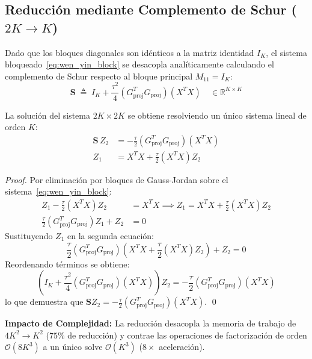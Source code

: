 \subsection{Reducción mediante Complemento de Schur ($2K \to K$)}
Dado que los bloques diagonales son idénticos a la matriz identidad $I_K$, el sistema bloqueado~\eqref{eq:wen_yin_block} se desacopla analíticamente calculando el complemento de Schur respecto al bloque principal $M_{11} = I_K$:
\begin{equation}
\mathbf{S} \;\triangleq\; I_K + \frac{\tau^2}{4} (G_{\text{proj}}^T G_{\text{proj}})(X^T X) \quad \in \mathbb{R}^{K \times K}
\end{equation}

\begin{theorem}

La solución del sistema $2K \times 2K$ se obtiene resolviendo un único sistema lineal de orden $K$:
\begin{align}
\mathbf{S} \, Z_2 &= -\frac{\tau}{2} (G_{\text{proj}}^T G_{\text{proj}})(X^T X) \\
Z_1 &= X^T X + \frac{\tau}{2} (X^T X) Z_2
\end{align}
\end{theorem}

\begin{proof}
Por eliminación por bloques de Gauss-Jordan sobre el sistema~\eqref{eq:wen_yin_block}:
\begin{align}
Z_1 - \frac{\tau}{2} (X^T X) Z_2 &= X^T X \implies Z_1 = X^T X + \frac{\tau}{2} (X^T X) Z_2 \\
\frac{\tau}{2} (G_{\text{proj}}^T G_{\text{proj}}) Z_1 + Z_2 &= 0
\end{align}
Sustituyendo $Z_1$ en la segunda ecuación:
\begin{equation}
\frac{\tau}{2} (G_{\text{proj}}^T G_{\text{proj}}) \left( X^T X + \frac{\tau}{2} (X^T X) Z_2 \right) + Z_2 = 0
\end{equation}
Reordenando términos se obtiene:
\begin{equation}
\left( I_K + \frac{\tau^2}{4} (G_{\text{proj}}^T G_{\text{proj}})(X^T X) \right) Z_2 = -\frac{\tau}{2} (G_{\text{proj}}^T G_{\text{proj}})(X^T X)
\end{equation}
lo que demuestra que $\mathbf{S} Z_2 = -\frac{\tau}{2} (G_{\text{proj}}^T G_{\text{proj}})(X^T X)$. \qed
\end{proof}

\textbf{Impacto de Complejidad:} La reducción desacopla la memoria de trabajo de $4K^2 \to K^2$ ($75\%$ de reducción) y contrae las operaciones de factorización de orden $\mathcal{O}(8K^3)$ a un único solve $\mathcal{O}(K^3)$ ($8\times$ aceleración).

